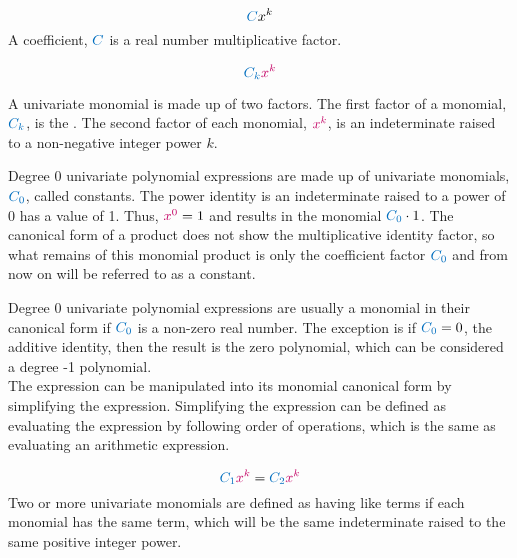 \documentclass[20150903-160354-rs2.2-MarksMathNotebook.tex]{subfiles}
\begin{document}
\begin{definition}[Coefficient]
\[
	\cBlue{C}x^{k}
\]
A coefficient, $\cBlue{C}$ is a real number multiplicative factor.\\

\end{definition}

\begin{definition}

\[
 \cBlue{C_{k}}\cRed{x^{k}}
\]

A univariate monomial is made up of two factors.  The first factor of a monomial, $\cBlue{C_{k}}$, is the . The second factor of each monomial, $\cRed{x^{k}}$, is an indeterminate raised to a non-negative integer power $k$. \\

\end{definition}

Degree 0 univariate polynomial expressions are made up of univariate monomials, $\cBlue{C_{0}}$, called \alert{constants}.  The power identity is an indeterminate raised to a power of 0 has a value of 1.  Thus, $\cRed{x^{0}}=1$ and results in the monomial $\cBlue{C_{0}} \cdot 1$.  The canonical form of a product does not show the multiplicative identity factor, so what remains of this monomial product is only the coefficient factor $\cBlue{C_{0}}$ and from now on will be referred to as a \alert{constant}.

Degree 0 univariate polynomial expressions are usually a monomial in their canonical form if $\cBlue{C_{0}}$ is a non-zero real number.  The exception is if $\cBlue{C_{0}}=0$, the additive identity, then the result is the zero polynomial, which can be considered a degree -1 polynomial.\\

The expression can be manipulated into its monomial canonical form by simplifying the expression.  Simplifying the expression can be defined as evaluating the expression by following order of operations, which is the same as evaluating an arithmetic expression.

\begin{definition}

\[
\cBlue{C_{1}}\cRed{x^{k}} = \cBlue{C_{2}}\cRed{x^{k}}
\]
Two or more univariate monomials are defined as having like terms if each monomial has the same term, which will be the same indeterminate raised to the same positive integer power.
\end{definition}
\end{document}
